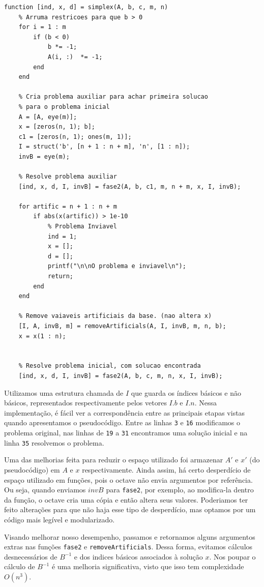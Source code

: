 \documentclass[12pt]{article}
\begin{document}
    \begin{lstlisting}
function [ind, x, d] = simplex(A, b, c, m, n)
    % Arruma restricoes para que b > 0
    for i = 1 : m
        if (b < 0)
            b *= -1;
            A(i, :)  *= -1;
        end
    end

    % Cria problema auxiliar para achar primeira solucao 
    % para o problema inicial
    A = [A, eye(m)];
    x = [zeros(n, 1); b];
    c1 = [zeros(n, 1); ones(m, 1)];
    I = struct('b', [n + 1 : n + m], 'n', [1 : n]);
    invB = eye(m);

    % Resolve problema auxiliar
    [ind, x, d, I, invB] = fase2(A, b, c1, m, n + m, x, I, invB);

    for artific = n + 1 : n + m
		if abs(x(artific)) > 1e-10
			% Problema Inviavel
			ind = 1;
			x = [];
			d = [];
			printf("\n\nO problema e inviavel\n");
			return;
		end
    end

    % Remove vaiaveis artificiais da base. (nao altera x)
    [I, A, invB, m] = removeArtificials(A, I, invB, m, n, b);
    x = x(1 : n);


    % Resolve problema inicial, com solucao encontrada
    [ind, x, d, I, invB] = fase2(A, b, c, m, n, x, I, invB);
    \end{lstlisting}

	
	Utilizamos uma estrutura chamada de $I$ que guarda os índices básicos e não básicos, representados respectivamente pelos vetores $I.b$ e $I.n$. Nessa implementação, é fácil ver a correspondência entre as principais etapas vistas quando apresentamos o pseudocódigo. Entre as linhas \texttt{3} e \texttt{16} modificamos o problema original, nas linhas de \texttt{19} a \texttt{31} encontramos uma solução inicial e na linha \texttt{35} resolvemos o problema.
    
    Uma das melhorias feita para reduzir o espaço utilizado foi armazenar $A'$ e $x'$ (do pseudocódigo) em $A$ e $x$ respectivamente. Ainda assim, há certo desperdício de espaço utilizado em funções, pois o octave não envia argumentos por referência. Ou seja, quando enviamos $invB$ para \texttt{fase2}, por exemplo, ao modifica-la dentro da função, o octave cria uma cópia e então altera seus valores. Poderiamos ter feito alterações para que não haja esse tipo de desperdício, mas optamos por um código mais legível e modularizado.
    
    Visando melhorar nosso desempenho, passamos e retornamos alguns argumentos extras nas funções \texttt{fase2} e \texttt{removeArtificials}. Dessa forma, evitamos cálculos desnecessários de $B^{-1}$ e dos indices básicos associados à solução $x$. Nos poupar o cálculo de $B^{-1}$ é uma melhoria significativa, visto que isso tem complexidade $O(n^3)$.
\end{document}

